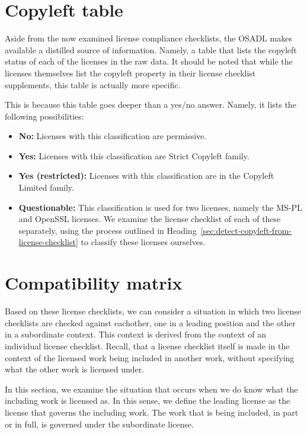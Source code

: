 \section{Copyleft table}

Aside from the now examined license compliance checklists, the OSADL makes available a distilled source of information. Namely, a table that lists the copyleft status of each of the licenses in the raw data. It should be noted that while the licenses themselves list the copyleft property in their license checklist supplements, this table is actually more specific.

This is because this table goes deeper than a yes/no answer. Namely, it lists the following possibilities:

\begin{itemize}
	\item \textbf{No:} Licenses with this classification are permissive.
	\item \textbf{Yes:} Licenses with this classification are Strict Copyleft family.
	\item \textbf{Yes (restricted):} Licenses with this classification are in the Copyleft Limited family.
	\item \textbf{Questionable:} This classification is used for two licenses, namely the MS-PL and OpenSSL licenses. We examine the license checklist of each of these separately, using the process outlined in Heading~\ref{sec:detect-copyleft-from-license-checklist} to classify these licenses ourselves.
	
\end{itemize}

\section{Compatibility matrix}

Based on these license checklists, we can consider a situation in which two license checklists are checked against eachother, one in a leading position and the other in a subordinate context. This context is derived from the context of an individual license checklist. Recall, that a license checklist itself is made in the context of the licensed work being included in another work, without specifying what the other work is licensed under.

In this section, we examine the situation that occurs when we do know what the including work is licensed as. In this sense, we define the leading license as the license that governs the including work. The work that is being included, in part or in full, is governed under the subordinate license. \\

